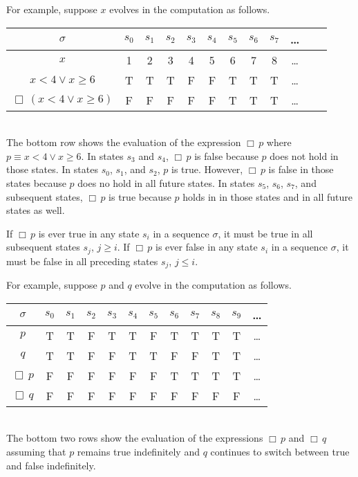 \documentclass[12pt, fleqn, leqno]{article}
\newcommand{\lllgap}{12pt}                          %
\newcommand{\Always}{\Box\,}
\begin{document}
For example, suppose $x$ evolves in the computation as follows.\\[\lllgap]
\begin{tabular}{c|ccccccccccc}
  $\sigma$                      & $s_0$ & $s_1$ & $s_2$ & $s_3$ & $s_4$ & $s_5$ & $s_6$ & $s_7$ & \dots \\
  \hline
  $x$                           & 1     & 2     & 3     & 4     & 5     & 6     & 7     & 8     &  \dots\\
  $x < 4 \lor x \ge 6$          & T     & T     & T     & F     & F     & T     & T     & T     &  \dots\\
  $\Always(x < 4 \lor x \ge 6)$ & F     & F     & F     & F     & F     & T     & T     & T     &  \dots\\
\end{tabular}\\[\lllgap]
The bottom row shows the evaluation of the expression $\Always p$ where $p\equiv x < 4 \lor x \ge 6$.
In states $s_3$ and $s_4$, $\Always p$ is false because $p$ does not hold in those states.
In states $s_0$, $s_1$, and $s_2$, $p$ is true. However, $\Always p$ is false in those states because $p$ does no hold
in all future states.
In states $s_5$, $s_6$, $s_7$, and subsequent states, $\Always p$ is true because $p$ holds in in those states
and in all future states as well.

If $\Always p$ is ever true in any state $s_i$ in a sequence $\sigma$, it must be true in all subsequent states $s_j$, $j\ge i$.
If $\Always p$ is ever false in any state $s_i$ in a sequence $\sigma$, it must be false in all preceding states $s_j$, $j\le i$.

For example, suppose $p$ and $q$ evolve in the computation as follows.\\[\lllgap]
\begin{tabular}{c|ccccccccccc}
  $\sigma$       & $s_0$ & $s_1$ & $s_2$ & $s_3$ & $s_4$ & $s_5$ & $s_6$ & $s_7$ & $s_8$& $s_9$  & \dots \\
  \hline
  $p$            & T     & T     & F     & T     & T     & F     & T     & T     & T     & T     &  \dots\\
  $q$            & T     & T     & F     & F     & T     & T     & F     & F     & T     & T     &  \dots\\
  $\Always p$    & F     & F     & F     & F     & F     & F     & T     & T     & T     & T     &  \dots\\
  $\Always q$    & F     & F     & F     & F     & F     & F     & F     & F     & F     & F     &  \dots\\
\end{tabular}\\[\lllgap]
The bottom two rows show the evaluation of the expressions $\Always p$ and $\Always q$
assuming that $p$ remains true indefinitely and $q$ continues to switch between true and false indefinitely.
\end{document}
